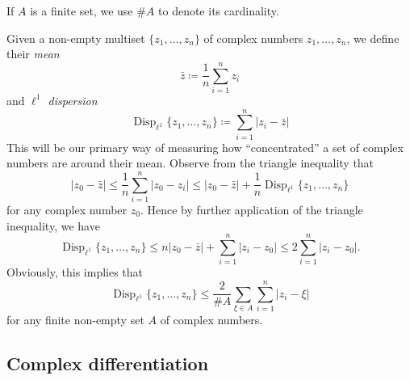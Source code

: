 \documentclass[12pt]{amsart}
\newcommand{\Disp}{\operatorname{Disp}_{\ell^1}}
\begin{document}
If $A$ is a finite set, we use $\# A$ to denote its cardinality.

Given a non-empty multiset $\{z_1,\dots,z_n\}$ of complex numbers $z_1,\dots,z_n$, we define their \emph{mean}
$$ \bar{z} \coloneqq \frac{1}{n} \sum_{i=1}^n z_i$$
and \emph{$\ell^1$ dispersion}
\begin{equation}\label{disp-def}
    \Disp \{ z_1,\dots,z_n \} \coloneqq \sum_{i=1}^n |z_i - \bar{z}|
\end{equation}
This will be our primary way of measuring how ``concentrated'' a set of complex numbers are around their mean.
Observe from the triangle inequality that
\begin{equation}\label{disp-upper}
 |z_0 - \bar{z}| \leq \frac{1}{n} \sum_{i=1}^n |z_0 - z_i| \leq |z_0 - \bar{z}| + \frac{1}{n} \Disp \{z_1,\dots,z_n\}
\end{equation}
for any complex number $z_0$. Hence by further application of the triangle inequality, we have
\begin{equation}\label{disp}
 \Disp \{ z_1,\dots,z_n\} \leq n |z_0 - \bar{z}| + \sum_{i=1}^n |z_i - z_0| \leq 2 \sum_{i=1}^n |z_i - z_0|.
\end{equation}
Obviously, this implies that
\begin{equation}\label{disp-sum}
 \Disp \{ z_1,\dots,z_n\} \leq \frac{2}{\# A} \sum_{\xi \in A} \sum_{i=1}^n |z_i - \xi|
\end{equation}
for any finite non-empty set $A$ of complex numbers.

\subsection{Complex differentiation}
\end{document}
